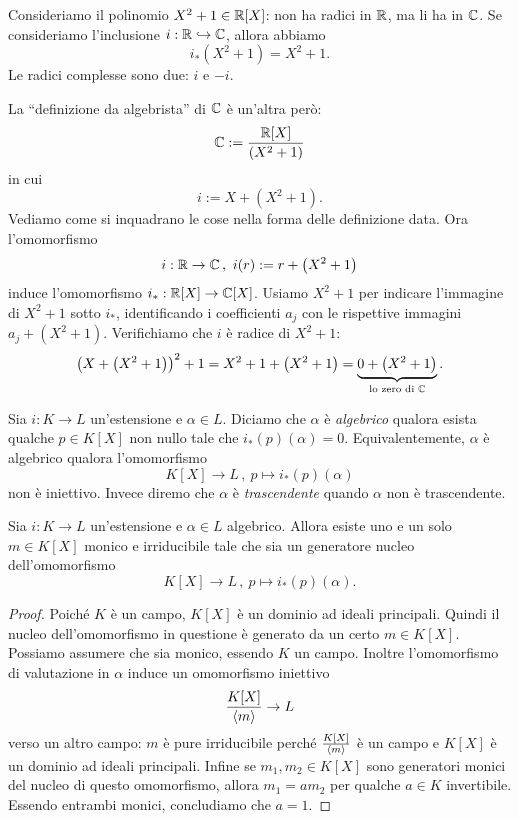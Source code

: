 \begin{esem}
Consideriamo il polinomio $X^2+1 \in \mathbb{R}[X]$: non ha radici in $\mathbb{R}$, ma li ha in $\mathbb{C}$. Se consideriamo l'inclusione $i : \mathbb{R} \hookrightarrow \mathbb{C}$, allora abbiamo
\[i_\ast \left(X^2+1\right) = X^2+1 .\]
Le radici complesse sono due: $i$ e $-i$.
\end{esem}

\begin{esem}\label{esem:AlgebristaC}
La \enquote{definizione da algebrista} di $\mathbb{C}$ è un'altra però:
\[\mathbb{C} := \frac{\mathbb{R}[X]}{\left(X^2+1\right)}\]
in cui
\[i := X + \left(X^2+1\right) .\]
Vediamo come si inquadrano le cose nella forma delle definizione data. Ora l'omomorfismo
\[i : \mathbb{R} \to \mathbb{C}\,,\ i(r) := r + \left(X^2+1\right) \]
induce l'omomorfismo $i_\ast : \mathbb{R}[X] \to \mathbb{C}[X]$. Usiamo $X^2+1$ per indicare l'immagine di $X^2+1$ sotto $i_\ast$, identificando i coefficienti $a_j$ con le rispettive immagini $a_j + \left(X^2+1\right)$. Verifichiamo che $i$ è radice di $X^2+1$:
\[\left(X + \left(X^2+1\right)\right)^2 +1 = X^2 + 1 + \left(X^2+1\right) = \underbrace{0 + \left(X^2+1\right)}_{\text{lo zero di } \C} .\]
\end{esem}

\begin{defi}
Sia $i : K \to L$ un'estensione e $\alpha \in L$. Diciamo che $\alpha$ è {\em algebrico} qualora esista qualche $p \in K[X]$ non nullo tale che $i_\ast(p)(\alpha) = 0$. Equivalentemente, $\alpha$ è algebrico qualora l'omomorfismo
\[K[X] \to L\,,\ p \mapsto i_\ast(p)(\alpha)\]
non è iniettivo. Invece diremo che $\alpha$ è {\em trascendente} quando $\alpha$ non è trascendente.
\end{defi}


\begin{prop}
Sia $i : K \to L$ un'estensione e $\alpha \in L$ algebrico. Allora esiste uno e un solo $m \in K[X]$ monico e irriducibile tale che sia un generatore nucleo dell'omomorfismo
\[K[X] \to L\,,\ p \mapsto i_\ast(p)(\alpha) .\]
\end{prop}

\begin{proof}
Poiché $K$ è un campo, $K[X]$ è un dominio ad ideali principali. Quindi il nucleo dell'omomorfismo in questione è generato da un certo $m \in K[X]$. Possiamo assumere che sia monico, essendo $K$ un campo. Inoltre l'omomorfismo di valutazione in $\alpha$ induce un omomorfismo iniettivo
\[\frac{K[X]}{\left\langle m\right\rangle} \to L\]
verso un altro campo: $m$ è pure irriducibile perché $\frac{K[X]}{\left\langle m\right\rangle}$ è un campo e $K[X]$ è un dominio ad ideali principali. Infine se $m_1, m_2 \in K[X]$ sono generatori monici del nucleo di questo omomorfismo, allora $m_1 = a m_2$ per qualche $a \in K$ invertibile. Essendo entrambi monici, concludiamo che $a = 1$.
\end{proof}

